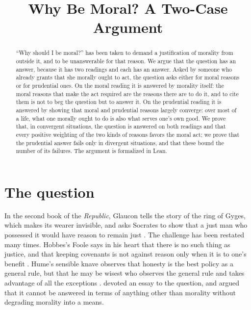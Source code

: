 \documentclass{situationist-preprint}
\title{Why Be Moral? A Two-Case Argument}
\begin{document}
\maketitle

\begin{abstract}
\enquote{Why should I be moral?} has been taken to demand a justification of morality from outside it, and to be unanswerable for that reason. We argue that the question has an answer, because it has two readings and each has an answer. Asked by someone who already grants that she morally ought to act, the question asks either for moral reasons or for prudential ones. On the moral reading it is answered by morality itself: the moral reasons that make the act required are the reasons there are to do it, and to cite them is not to beg the question but to answer it. On the prudential reading it is answered by showing that moral and prudential reasons largely converge: over most of a life, what one morally ought to do is also what serves one's own good. We prove that, in convergent situations, the question is answered on both readings and that every positive weighting of the two kinds of reasons favors the moral act; we prove that the prudential answer fails only in divergent situations, and that these bound the number of its failures. The argument is formalized in Lean.
\end{abstract}

\section{The question}

In the second book of the \emph{Republic}, Glaucon tells the story of the ring of Gyges, which makes its wearer invisible, and asks Socrates to show that a just man who possessed it would have reason to remain just \citep[II, 359b--360d]{Plato}. The challenge has been restated many times. Hobbes's Foole says in his heart that there is no such thing as justice, and that keeping covenants is not against reason only when it is to one's benefit \citep[ch.~15]{Hobbes1651}. Hume's sensible knave observes that honesty is the best policy as a general rule, but that he may be wisest who observes the general rule and takes advantage of all the exceptions \citep[Conclusion, Part~II]{HumeEPM}. \citet{Bradley1876} devoted an essay to the question, and argued that it cannot be answered in terms of anything other than morality without degrading morality into a means.
\end{document}
